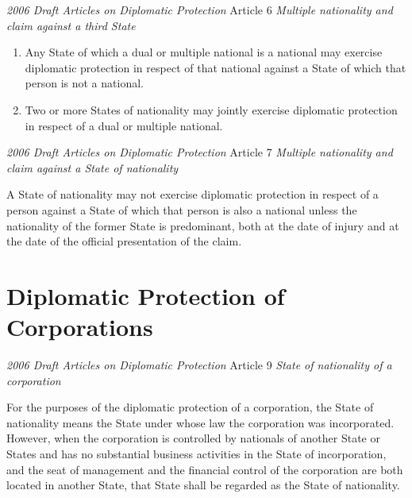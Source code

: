 \begin{conventiondetails}{\textit{2006 Draft Articles on Diplomatic Protection} Article 6}
    \flushleft
    \textit{Multiple nationality and claim against a third State}

    \vspace{\baselineskip}

    \begin{enumerate}
        \item Any State of which a dual or multiple national is a national may exercise diplomatic protection in respect of that national against a State of which that person is not a national. 
        \item Two or more States of nationality may jointly exercise diplomatic protection in respect of a dual or multiple national.
    \end{enumerate}
\end{conventiondetails}

\begin{conventiondetails}{\textit{2006 Draft Articles on Diplomatic Protection} Article 7}
    \flushleft
    \textit{Multiple nationality and claim against a State of nationality}

    \vspace{\baselineskip}

    A State of nationality may not exercise diplomatic protection in respect of a person against a State of which that person is also a national unless the nationality of the former State is predominant, both at the date of injury and at the date of the official presentation of the claim.
\end{conventiondetails}

\section{Diplomatic Protection of Corporations}
\begin{conventiondetails}{\textit{2006 Draft Articles on Diplomatic Protection} Article 9}
    \flushleft
    \textit{State of nationality of a corporation}
    
    \vspace{\baselineskip}

    For the purposes of the diplomatic protection of a corporation, the State of nationality means the State under whose law the corporation was incorporated. However, when the corporation is controlled by nationals of another State or States and has no substantial business activities in the State of incorporation, and the seat of management and the financial control of the corporation are both located in another State, that State shall be regarded as the State of nationality.
\end{conventiondetails}


